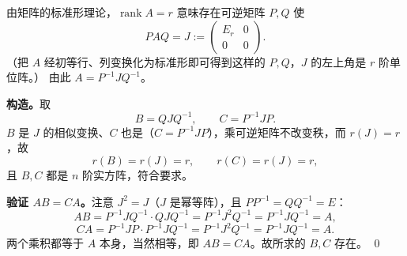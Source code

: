 \begin{solution}
由矩阵的标准形理论，$\operatorname{rank}A=r$ 意味存在可逆矩阵 $P,Q$ 使
\[
PAQ=J:=\begin{pmatrix}E_r&0\\0&0\end{pmatrix}.
\]
（把 $A$ 经初等行、列变换化为标准形即可得到这样的 $P,Q$，$J$ 的左上角是 $r$ 阶单位阵。）
由此 $A=P^{-1}JQ^{-1}$。

\textbf{构造。}取
\[
B=QJQ^{-1},\qquad C=P^{-1}JP .
\]
$B$ 是 $J$ 的相似变换、$C$ 也是（$C=P^{-1}JP$），乘可逆矩阵不改变秩，而 $r(J)=r$，故
\[
r(B)=r(J)=r,\qquad r(C)=r(J)=r,
\]
且 $B,C$ 都是 $n$ 阶实方阵，符合要求。

\textbf{验证 $AB=CA$。}注意 $J^{2}=J$（$J$ 是幂等阵），且 $PP^{-1}=QQ^{-1}=E$：
\[
AB=P^{-1}JQ^{-1}\cdot QJQ^{-1}=P^{-1}J^{2}Q^{-1}=P^{-1}JQ^{-1}=A,
\]
\[
CA=P^{-1}JP\cdot P^{-1}JQ^{-1}=P^{-1}J^{2}Q^{-1}=P^{-1}JQ^{-1}=A .
\]
两个乘积都等于 $A$ 本身，当然相等，即 $AB=CA$。故所求的 $B,C$ 存在。
\qed
{}
\end{solution}
